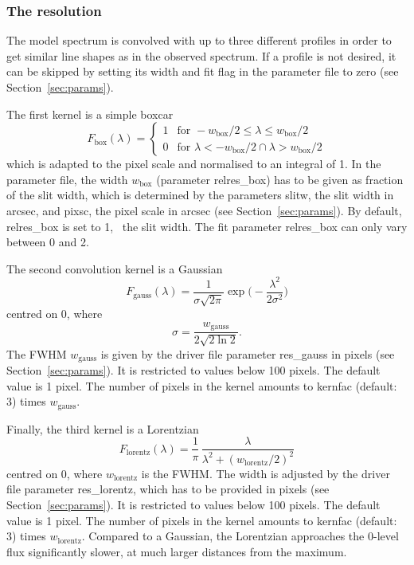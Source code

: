 \subsubsection{The resolution}\label{sec:resolution}
The model spectrum is convolved with up to three different profiles in order to
get similar line shapes as in the observed spectrum. If a profile is not
desired, it can be skipped by setting its width and fit flag in the parameter
file to zero (see Section~\ref{sec:params}).

The first kernel is a simple boxcar
\begin{equation}
F_\mathrm{box}(\lambda) = \left\{ \begin{array}{ll}
1 & \textrm{for\ } -w_\mathrm{box}/2 \le \lambda \le w_\mathrm{box}/2 \\
0 & \textrm{for\ } \lambda < -w_\mathrm{box}/2 \cap \lambda > w_\mathrm{box}/2
\end{array} \right.
\end{equation}
which is adapted to the pixel scale and normalised to an integral of 1. In
the parameter file, the width $w_\mathrm{box}$ (parameter {\sc relres\_box}) has
to be given as fraction of the slit width, which is determined by the
parameters {\sc slitw}, the slit width in arcsec, and {\sc pixsc}, the pixel
scale in arcsec (see Section~\ref{sec:params}). By default, {\sc relres\_box}
is set to 1, \ie\ the slit width. The fit parameter {\sc relres\_box} can only
vary between 0 and 2.

The second convolution kernel is a Gaussian
\begin{equation}
F_\mathrm{gauss}(\lambda) = \frac{1}{\sigma \sqrt{2 \pi}}
\exp{\Bigg(-\frac{\lambda^2}{2 \sigma^2}\Bigg)}
\end{equation}
centred on 0, where
\begin{equation}
\sigma = \frac{w_\mathrm{gauss}}{2 \sqrt{2 \ln{2}}}.
\end{equation}
The FWHM $w_\mathrm{gauss}$ is given by the driver file parameter
{\sc res\_gauss} in pixels (see Section~\ref{sec:params}). It is restricted to
values below 100 pixels. The default value is 1 pixel. The number of pixels in
the kernel amounts to {\sc kernfac} (default: 3) times $w_\mathrm{gauss}$.

Finally, the third kernel is a Lorentzian
\begin{equation}
F_\mathrm{lorentz}(\lambda) = \frac{1}{\pi} \,
\frac{\lambda}{\lambda^2 + (w_\mathrm{lorentz}/2)^2}
\end{equation}
centred on 0, where $w_\mathrm{lorentz}$ is the FWHM. The width is adjusted by
the driver file parameter {\sc res\_lorentz}, which has to be provided in
pixels (see Section~\ref{sec:params}). It is restricted to values below 100
pixels. The default value is 1 pixel. The number of pixels in the kernel
amounts to {\sc kernfac} (default: 3) times $w_\mathrm{lorentz}$. Compared to a
Gaussian, the Lorentzian approaches the 0-level flux significantly slower, at
much larger distances from the maximum.

